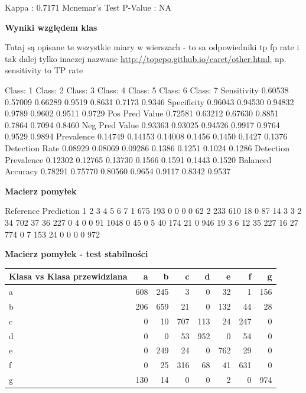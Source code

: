 \documentclass[11pt]{article} %
\begin{document}
                  Kappa : 0.7171          
 Mcnemar's Test P-Value : NA   
 
\textbf{Wyniki względem klas}

Tutaj są opisane te wszystkie miary w wierszach - to sa odpowiedniki tp fp rate i tak dalej tylko inaczej nazwane \url{http://topepo.github.io/caret/other.html}, np. sensitivity to TP rate

Class: 1 Class: 2 Class: 3 Class: 4 Class: 5 Class: 6 Class: 7
Sensitivity           0.60538  0.57009  0.66289   0.9519   0.8631   0.7173   0.9346
Specificity           0.96043  0.94530  0.94832   0.9789   0.9602   0.9511   0.9729
Pos Pred Value        0.72581  0.63212  0.67630   0.8851   0.7864   0.7094   0.8460
Neg Pred Value        0.93363  0.93025  0.94526   0.9917   0.9764   0.9529   0.9894
Prevalence            0.14749  0.14153  0.14008   0.1456   0.1450   0.1427   0.1376
Detection Rate        0.08929  0.08069  0.09286   0.1386   0.1251   0.1024   0.1286
Detection Prevalence  0.12302  0.12765  0.13730   0.1566   0.1591   0.1443   0.1520
Balanced Accuracy     0.78291  0.75770  0.80560   0.9654   0.9117   0.8342   0.9537
 
\textbf{Macierz pomyłek}

          Reference
Prediction    1    2    3    4    5    6    7
         1  675  193    0    0    0    0   62
         2  233  610   18    0   87   14    3
         3    2   34  702   37   36  227    0
         4    0    0   91 1048    0   45    0
         5   40  174   21    0  946   19    3
         6   12   35  227   16   27  774    0
         7  153   24    0    0    0    0  972

\textbf{Macierz pomyłek - test stabilności}
 
 \begin{center}
    \begin{tabular}{ | l | r | r | r | r | r | r | r | }
    \hline
 Klasa vs Klasa przewidziana &  a &  b &  c &  d &  e &  f &  g \\ \hline
a & 608 & 245 &  3 &  0 & 32  & 1 & 156 \\
b & 206 & 659 &  21 &  0 & 132 & 44 & 28 \\
c &  0 & 10 & 707 & 113 & 24 & 247 &  0 \\
d &  0 &  0 &  53 & 952 &  0 & 54 &  0\\
e & 0 & 249 &  24 &  0 & 762 & 29 &  0 \\
f &  0  & 25 & 316 & 68 & 41 & 631 &  0 \\
g & 130 & 14 &  0 &  0 &  2 &  0 & 974 \\ \hline
    \end{tabular}
\end{center}
 
\end{document}
